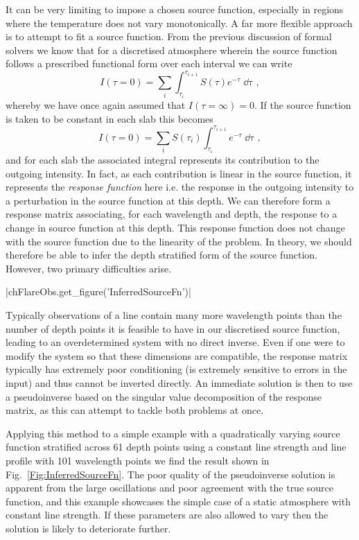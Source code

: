 It can be very limiting to impose a chosen source function, especially in regions where the temperature does not vary monotonically.
A far more flexible approach is to attempt to fit a source function.
From the previous discussion of formal solvers we know that for a discretised atmosphere wherein the source function follows a prescribed functional form over each interval we can write
\begin{equation}
    I(\tau=0) = \sum_i \int_{\tau_i}^{\tau_{i+1}} S(\tau)e^{-\tau} \mathop{\dd{}\tau},
\end{equation}
whereby we have once again assumed that $I(\tau=\infty)=0$.
If the source function is taken to be constant in each slab this becomes
\begin{equation}\label{Eq:LinearResponse}
    I(\tau=0) = \sum_i S(\tau_i) \int_{\tau_i}^{\tau_{i+1}} e^{-\tau} \mathop{\dd{}\tau},
\end{equation}
and for each slab the associated integral represents its contribution to the outgoing intensity.
In fact, as each contribution is linear in the source function, it represents the \emph{response function} here i.e. the response in the outgoing intensity to a perturbation in the source function at this depth.
We can therefore form a response matrix associating, for each wavelength and depth, the response to a change in source function at this depth.
This response function does not change with the source function due to the linearity of the problem.
In theory, we should therefore be able to infer the depth stratified form of the source function.
However, two primary difficulties arise.

\py[FlareObs]|chFlareObs.get_figure('InferredSourceFn')|

Typically observations of a line contain many more wavelength points than the number of depth points it is feasible to have in our discretised source function, leading to an overdetermined system with no direct inverse.
Even if one were to modify the system so that these dimensions are compatible, the response matrix typically has extremely poor conditioning (is extremely sensitive to errors in the input) and thus cannot be inverted directly.
An immediate solution is then to use a pseudoinverse based on the singular value decomposition of the response matrix, as this can attempt to tackle both problems at once.

Applying this method to a simple example with a quadratically varying source function stratified across 61 depth points using a constant line strength and line profile with 101 wavelength points we find the result shown in Fig.~\ref{Fig:InferredSourceFn}.
The poor quality of the pseudoinverse solution is apparent from the large oscillations and poor agreement with the true source function, and this example showcases the simple case of a static atmosphere with constant line strength.
If these parameters are also allowed to vary then the solution is likely to deteriorate further.


